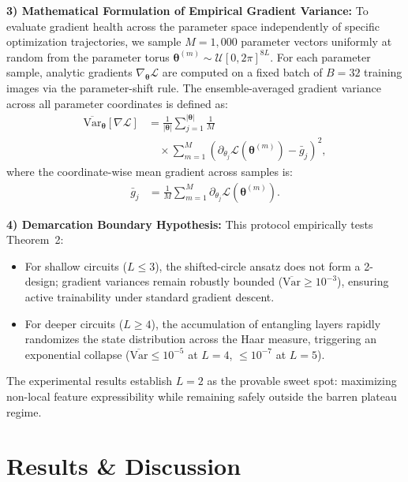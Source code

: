 \documentclass[pdflatex,sn-mathphys-num]{sn-jnl}%
\theoremstyle{thmstyleone}%
\theoremstyle{thmstyletwo}%
\theoremstyle{thmstylethree}%
\begin{document}
\textbf{3) Mathematical Formulation of Empirical Gradient Variance:}
To evaluate gradient health across the parameter space independently of specific optimization trajectories, we sample $M = 1{,}000$ parameter vectors uniformly at random from the parameter torus $\boldsymbol{\theta}^{(m)} \sim \mathcal{U}[0, 2\pi]^{8L}$. For each parameter sample, analytic gradients $\nabla_{\boldsymbol{\theta}} \mathcal{L}$ are computed on a fixed batch of $B = 32$ training images via the parameter-shift rule. The ensemble-averaged gradient variance across all parameter coordinates is defined as:
\begin{align}
\overline{\mathrm{Var}}_{\boldsymbol{\theta}}[\nabla \mathcal{L}] &= \frac{1}{|\boldsymbol{\theta}|} \sum_{j=1}^{|\boldsymbol{\theta}|} \frac{1}{M} \nonumber \\
&\quad \times \sum_{m=1}^{M} \left( \partial_{\theta_j} \mathcal{L}(\boldsymbol{\theta}^{(m)}) - \bar{g}_j \right)^2,
\label{eq:gradient_variance_metric}
\end{align}
where the coordinate-wise mean gradient across samples is:
\begin{align}
\bar{g}_j &= \frac{1}{M} \sum_{m=1}^{M} \partial_{\theta_j} \mathcal{L}(\boldsymbol{\theta}^{(m)}).
\label{eq:mean_gradient_def}
\end{align}

\textbf{4) Demarcation Boundary Hypothesis:}
This protocol empirically tests Theorem~2:
\begin{itemize}
    \item For shallow circuits ($L \le 3$), the shifted-circle ansatz does not form a 2-design; gradient variances remain robustly bounded ($\overline{\mathrm{Var}} \ge 10^{-3}$), ensuring active trainability under standard gradient descent.
    \item For deeper circuits ($L \ge 4$), the accumulation of entangling layers rapidly randomizes the state distribution across the Haar measure, triggering an exponential collapse ($\overline{\mathrm{Var}} \le 10^{-5}$ at $L = 4$, $\le 10^{-7}$ at $L = 5$).
\end{itemize}
The experimental results establish $L = 2$ as the provable sweet spot: maximizing non-local feature expressibility while remaining safely outside the barren plateau regime.

\section{Results \& Discussion}
\label{sec:results}
\end{document}
